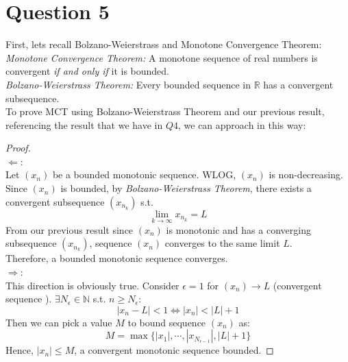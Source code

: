 \documentclass{article}
\begin{document}
\section*{Question 5}
\noindent First, lets recall Bolzano-Weierstrass and Monotone Convergence Theorem:
\\
\textit{Monotone Convergence Theorem: } A monotone sequence of real numbers is convergent \textit{if and only if} it is bounded.
\\
\textit{Bolzano-Weierstrass Theorem: } Every bounded sequence in $\mathbb{R}$ has a convergent subsequence.
\\
To prove MCT using Bolzano-Weierstrass Theorem and our previous result, referencing the result that we have in $Q4$, we can approach in this way:
\begin{proof}
    \hspace{0.001cm}
    \\
    $\Leftarrow$: 
    \\
    Let $(x_n)$ be a bounded monotonic sequence. WLOG, $(x_n)$ is non-decreasing.
    \\
    Since $(x_n)$ is bounded, by \textit{Bolzano-Weierstrass Theorem}, there exists a convergent subsequence $(x_{n_k})$ s.t.
    \[ \lim_{k \rightarrow \infty} x_{n_k} = L \]
    From our previous result since $(x_n)$ is monotonic and has a converging subsequence $(x_{n_k})$, sequence $(x_n)$ converges to the same limit $L$.
    \\
    Therefore, a bounded monotonic sequence converges.
    \\
    $\Rightarrow$: 
    \\
    This direction is obviously true. Consider $\epsilon = 1$ for $(x_n) \rightarrow L$ (convergent sequence ).
    $\exists N_{\epsilon} \in \mathbb{N}$ s.t. $n \geq N_{\epsilon}$:
    \[ |x_n - L| < 1 \Leftrightarrow |x_n| < |L| + 1 \]
    Then we can pick a value $M$ to bound sequence $(x_n)$ as:
    \[ M = \max \{|x_1|, \cdots, |x_{N_{\epsilon - 1}}|, |L| + 1 \} \]
    Hence, $|x_n| \leq M$, a convergent monotonic sequence bounded.
\end{proof}
\end{document}
